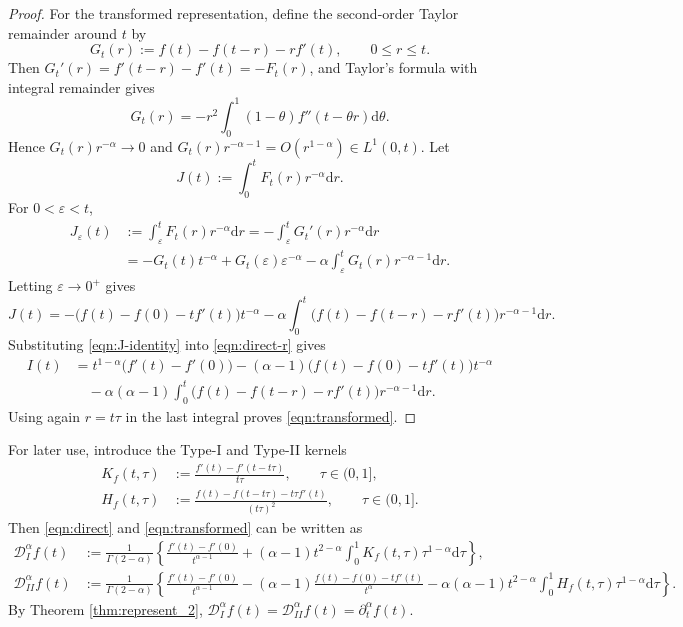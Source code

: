 \documentclass[preprint,3p,times]{elsarticle}
\def\dta{\partial_t^\alpha}
\def\d{\mathrm{d}}
\begin{document}
\begin{proof}
For the transformed representation, define the second-order Taylor remainder around $t$ by
\begin{equation}\label{eqn:G-def}
    G_t(r):=f(t)-f(t-r)-r f'(t),\qquad 0\le r\le t .
\end{equation}
Then $G_t'(r)=f'(t-r)-f'(t)=-F_t(r)$, and Taylor's formula with integral remainder gives
\begin{equation}\label{eqn:G-integral-remainder}
    G_t(r)=-r^2\int_0^1(1-\theta)f''(t-\theta r)\d\theta .
\end{equation}
Hence $G_t(r)r^{-\alpha}\to0$ and $G_t(r)r^{-\alpha-1}=O(r^{1-\alpha})\in L^1(0,t)$. Let
\[
    J(t):=\int_0^t F_t(r)r^{-\alpha}\d r .
\]
For $0<\varepsilon<t$,
\begin{align*}
J_\varepsilon(t)
&:=\int_\varepsilon^tF_t(r)r^{-\alpha}\d r
=-\int_\varepsilon^tG_t'(r)r^{-\alpha}\d r \\
&=-G_t(t)t^{-\alpha}+G_t(\varepsilon)\varepsilon^{-\alpha}
-\alpha\int_\varepsilon^tG_t(r)r^{-\alpha-1}\d r .
\end{align*}
Letting $\varepsilon\to0^+$ gives
\begin{equation}\label{eqn:J-identity}
J(t)=
-\bigl(f(t)-f(0)-t f'(t)\bigr)t^{-\alpha}
-\alpha\int_0^t\bigl(f(t)-f(t-r)-r f'(t)\bigr)r^{-\alpha-1}\d r .
\end{equation}
Substituting \eqref{eqn:J-identity} into \eqref{eqn:direct-r} gives
\begin{align}\label{eqn:transformed-r}
I(t)
&=t^{1-\alpha}\bigl(f'(t)-f'(0)\bigr)
-(\alpha-1)\bigl(f(t)-f(0)-t f'(t)\bigr)t^{-\alpha}\nonumber\\
&\quad-\alpha(\alpha-1)
\int_0^t\bigl(f(t)-f(t-r)-r f'(t)\bigr)r^{-\alpha-1}\d r .
\end{align}
Using again $r=t\tau$ in the last integral proves \eqref{eqn:transformed}.
\end{proof}

For later use, introduce the Type-I and Type-II kernels
\begin{align}
    K_f(t,\tau)
    &:=\frac{f'(t)-f'(t-t\tau)}{t\tau},
    \qquad \tau\in(0,1],\label{eqn:K-def}\\
    H_f(t,\tau)
    &:=\frac{f(t)-f(t-t\tau)-t\tau f'(t)}{(t\tau)^2},
    \qquad \tau\in(0,1].\label{eqn:H-def}
\end{align}
Then \eqref{eqn:direct} and \eqref{eqn:transformed} can be written as
\begin{align}
\mathcal D_I^\alpha f(t)
&:=\frac{1}{\Gamma(2-\alpha)}
\left\{
\frac{f'(t)-f'(0)}{t^{\alpha-1}}
+(\alpha-1)t^{2-\alpha}\int_0^1K_f(t,\tau)\tau^{1-\alpha}\d\tau
\right\},\label{eqn:D-I}\\
\mathcal D_{II}^\alpha f(t)
&:=\frac{1}{\Gamma(2-\alpha)}
\left\{
\frac{f'(t)-f'(0)}{t^{\alpha-1}}
-(\alpha-1)\frac{f(t)-f(0)-t f'(t)}{t^\alpha}
-\alpha(\alpha-1)t^{2-\alpha}\int_0^1H_f(t,\tau)\tau^{1-\alpha}\d\tau
\right\}.\label{eqn:D-II}
\end{align}
By Theorem \ref{thm:represent_2}, $\mathcal D_I^\alpha f(t)=\mathcal D_{II}^\alpha f(t)=\dta f(t)$.
\end{document}

